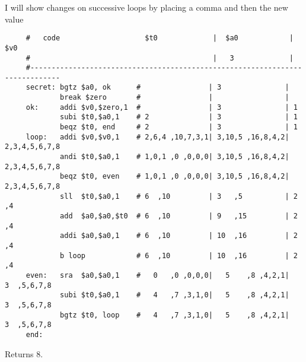 {\color{ans}
I will show changes on successive loops by placing a comma and then the new value

\begin{verbatim}
     #   code                    $t0             |  $a0            |  $v0
     #                                           |   3             |
     #-----------------------------------------------------------------------------
     secret: bgtz $a0, ok      #                | 3               |
             break $zero       #                |                 |
     ok:     addi $v0,$zero,1  #                | 3               | 1
             subi $t0,$a0,1    # 2              | 3               | 1
             beqz $t0, end     # 2              | 3               | 1
     loop:   addi $v0,$v0,1    # 2,6,4 ,10,7,3,1| 3,10,5 ,16,8,4,2| 2,3,4,5,6,7,8
             andi $t0,$a0,1    # 1,0,1 ,0 ,0,0,0| 3,10,5 ,16,8,4,2| 2,3,4,5,6,7,8
             beqz $t0, even    # 1,0,1 ,0 ,0,0,0| 3,10,5 ,16,8,4,2| 2,3,4,5,6,7,8
             sll  $t0,$a0,1    # 6  ,10         | 3   ,5          | 2  ,4
             add  $a0,$a0,$t0  # 6  ,10         | 9   ,15         | 2  ,4
             addi $a0,$a0,1    # 6  ,10         | 10  ,16         | 2  ,4
             b loop            # 6  ,10         | 10  ,16         | 2  ,4
     even:   sra  $a0,$a0,1    #   0   ,0 ,0,0,0|   5    ,8 ,4,2,1|   3  ,5,6,7,8
             subi $t0,$a0,1    #   4   ,7 ,3,1,0|   5    ,8 ,4,2,1|   3  ,5,6,7,8
             bgtz $t0, loop    #   4   ,7 ,3,1,0|   5    ,8 ,4,2,1|   3  ,5,6,7,8
     end:
\end{verbatim}

Returns 8.
}
